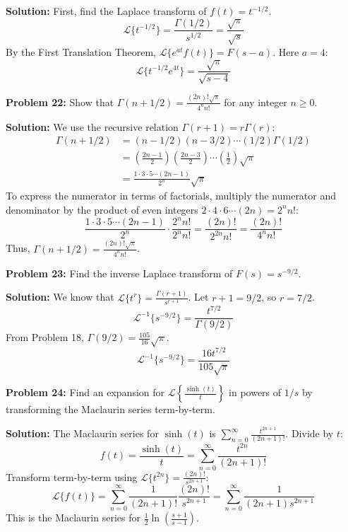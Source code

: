 \documentclass[11pt, letterpaper]{article}
\theoremstyle{definition}
\theoremstyle{remark}
\begin{document}
\textbf{Solution:}
First, find the Laplace transform of $f(t) = t^{-1/2}$.
\[ \mathcal{L}\{t^{-1/2}\} = \frac{\Gamma(1/2)}{s^{1/2}} = \frac{\sqrt{\pi}}{\sqrt{s}} \]
By the First Translation Theorem, $\mathcal{L}\{e^{at} f(t)\} = F(s - a)$. Here $a = 4$:
\[ \mathcal{L}\{t^{-1/2} e^{4t}\} = \frac{\sqrt{\pi}}{\sqrt{s - 4}} \]

\vspace{1em}
\textbf{Problem 22:} Show that $\Gamma(n + 1/2) = \frac{(2n)! \sqrt{\pi}}{4^n n!}$ for any integer $n \ge 0$.

\textbf{Solution:}
We use the recursive relation $\Gamma(r + 1) = r\Gamma(r)$:
\begin{align*}
\Gamma(n + 1/2) &= (n - 1/2)(n - 3/2) \cdots (1/2)\Gamma(1/2) \\
&= \left(\frac{2n - 1}{2}\right) \left(\frac{2n - 3}{2}\right) \cdots \left(\frac{1}{2}\right) \sqrt{\pi} \\
&= \frac{1 \cdot 3 \cdot 5 \cdots (2n - 1)}{2^n} \sqrt{\pi}
\end{align*}
To express the numerator in terms of factorials, multiply the numerator and denominator by the product of even integers $2 \cdot 4 \cdot 6 \cdots (2n) = 2^n n!$:
\[ \frac{1 \cdot 3 \cdot 5 \cdots (2n - 1)}{2^n} \cdot \frac{2^n n!}{2^n n!} = \frac{(2n)!}{2^{2n} n!} = \frac{(2n)!}{4^n n!} \]
Thus, $\Gamma(n + 1/2) = \frac{(2n)! \sqrt{\pi}}{4^n n!}$.

\vspace{1em}
\textbf{Problem 23:} Find the inverse Laplace transform of $F(s) = s^{-9/2}$.

\textbf{Solution:}
We know that $\mathcal{L}\{t^r\} = \frac{\Gamma(r+1)}{s^{r+1}}$. Let $r + 1 = 9/2$, so $r = 7/2$.
\[ \mathcal{L}^{-1} \{s^{-9/2}\} = \frac{t^{7/2}}{\Gamma(9/2)} \]
From Problem 18, $\Gamma(9/2) = \frac{105}{16}\sqrt{\pi}$.
\[ \mathcal{L}^{-1} \{s^{-9/2}\} = \frac{16 t^{7/2}}{105\sqrt{\pi}} \]

\vspace{1em}
\textbf{Problem 24:} Find an expansion for $\mathcal{L} \left\{ \frac{\sinh(t)}{t} \right\}$ in powers of $1/s$ by transforming the Maclaurin series term-by-term.

\textbf{Solution:}
The Maclaurin series for $\sinh(t)$ is $\sum_{n=0}^\infty \frac{t^{2n+1}}{(2n+1)!}$.
Divide by $t$:
\[ f(t) = \frac{\sinh(t)}{t} = \sum_{n=0}^\infty \frac{t^{2n}}{(2n+1)!} \]
Transform term-by-term using $\mathcal{L}\{t^{2n}\} = \frac{(2n)!}{s^{2n+1}}$:
\[ \mathcal{L}\{f(t)\} = \sum_{n=0}^\infty \frac{1}{(2n+1)!} \frac{(2n)!}{s^{2n+1}} = \sum_{n=0}^\infty \frac{1}{(2n+1)s^{2n+1}} \]
This is the Maclaurin series for $\frac{1}{2} \ln\left(\frac{s+1}{s-1}\right)$.
\end{document}
